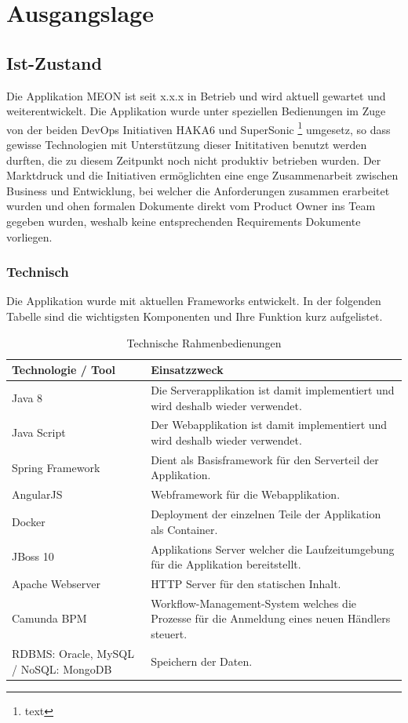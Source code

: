 \graphicspath{{./images/}}

\chapter{Ausgangslage}

\section{Ist-Zustand}

Die Applikation MEON ist seit x.x.x in Betrieb und wird aktuell gewartet und weiterentwickelt. Die Applikation wurde unter speziellen Bedienungen im Zuge von der beiden DevOps Initiativen HAKA6 und SuperSonic \footnote{text} umgesetz, so dass gewisse Technologien mit Unterstützung dieser Inititativen benutzt werden durften, die zu diesem Zeitpunkt noch nicht produktiv betrieben wurden. Der Marktdruck und die Initiativen ermöglichten eine enge Zusammenarbeit zwischen Business und Entwicklung, bei welcher die Anforderungen zusammen erarbeitet wurden und ohen formalen Dokumente direkt vom Product Owner ins Team gegeben wurden, weshalb keine entsprechenden Requirements Dokumente vorliegen.

\subsection{Technisch}

Die Applikation wurde mit aktuellen Frameworks entwickelt. In der folgenden Tabelle sind die wichtigsten Komponenten und Ihre Funktion kurz aufgelistet.

\begin{table}[H]
	\centering
	\caption{Technische Rahmenbedienungen}
	\begin{tabular}{ | p{4cm} | p{12cm} | }
		\toprule
		{\textbf{Technologie / Tool}} & {\textbf{Einsatzzweck}} \\
		\midrule
		Java 8 & Die Serverapplikation ist damit implementiert und wird deshalb wieder verwendet. \\ \hline
		Java Script & Der Webapplikation ist damit implementiert und wird deshalb wieder verwendet. \\ \hline
		Spring Framework & Dient als Basisframework für den Serverteil der Applikation.  \\ \hline
		AngularJS & Webframework für die Webapplikation. \\ \hline
		Docker & Deployment der einzelnen Teile der Applikation als Container. \\ \hline
		JBoss 10 & Applikations Server welcher die Laufzeitumgebung für die Applikation bereitstellt. \\ \hline
		Apache Webserver & HTTP Server für den statischen Inhalt. \\ \hline
		Camunda BPM & Workflow-Management-System welches die Prozesse für die Anmeldung eines neuen Händlers steuert. \\ \hline
		RDBMS: Oracle, MySQL / NoSQL: MongoDB & Speichern der Daten. \\
		\bottomrule
	\end{tabular}
\end{table}

